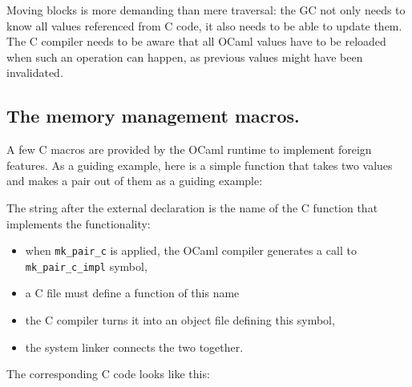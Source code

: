 \documentclass[a4paper]{easychair}
\begin{document}
Moving blocks is more demanding than mere traversal: the GC not only
needs to know all values referenced from C code, it also needs to be
able to update them. The C compiler needs to be aware that all OCaml
values have to be reloaded when such an operation can happen, as
previous values might have been invalidated.

\hypertarget{the-memory-management-macros.}{%
\subsection{The memory management
macros.}\label{the-memory-management-macros.}}

A few C macros are provided by the OCaml runtime to implement foreign
features. As a guiding example, here is a simple function that takes two
values and makes a pair out of them as a guiding example:

\begin{Shaded}
\begin{Highlighting}[]

\end{Highlighting}
\end{Shaded}

The string after the external declaration is the name of the C function
that implements the functionality:

\begin{itemize}
\tightlist
\item
  when \texttt{mk\_pair\_c} is applied, the OCaml compiler generates a
  call to \texttt{mk\_pair\_c\_impl} symbol,
\item
  a C file must define a function of this name
\item
  the C compiler turns it into an object file defining this symbol,
\item
  the system linker connects the two together.
\end{itemize}

The corresponding C code looks like this:

\begin{Shaded}
\begin{Highlighting}[]
\NormalTok{\{}
\NormalTok{, }\NormalTok{);}
\NormalTok{\}}
\end{Highlighting}
\end{Shaded}
\end{document}
